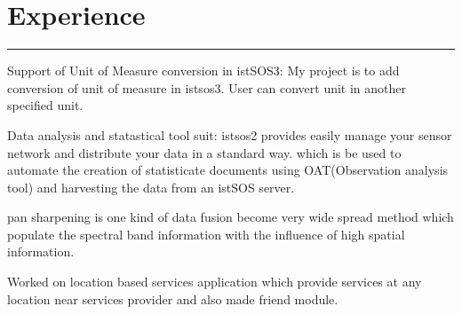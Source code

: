 \documentclass[]{sahana}
\begin{document}
\hfill
\begin{minipage}[t]{0.66\textwidth} 
\section{Experience}
\noindent\rule{12.5cm}{0.4pt}
 
\noindent
\hspace{5em}%
\begin{minipage}{0.85\textwidth\vspace{2pt}}
Support of Unit of Measure conversion in istSOS3: My project is to add conversion of
unit of measure in istsos3. User can convert unit in another specified unit.
\end{minipage}
\sectionsep

 
\noindent
\hspace{5em}%
\begin{minipage}{0.85\textwidth\vspace{2pt}}
Data analysis and statastical tool suit: istsos2 provides easily manage your sensor network
and distribute your data in a standard way. which is be used to automate the creation of statisticate
documents using OAT(Observation analysis tool) and harvesting the data from an istSOS server.
\end{minipage}
\sectionsep

 
\noindent
\hspace{5em}%
\begin{minipage}{0.85\textwidth\vspace{2pt}}
pan sharpening is one kind of data fusion become very wide spread method which populate the spectral band information with the influence of high spatial information.
\end{minipage}
\sectionsep

 
\noindent
\hspace{5em}%
\begin{minipage}{0.85\textwidth\vspace{2pt}}
Worked on location based services application which provide services at any location near
services provider and also made friend module.
\end{minipage}

\end{minipage}
\end{document}
